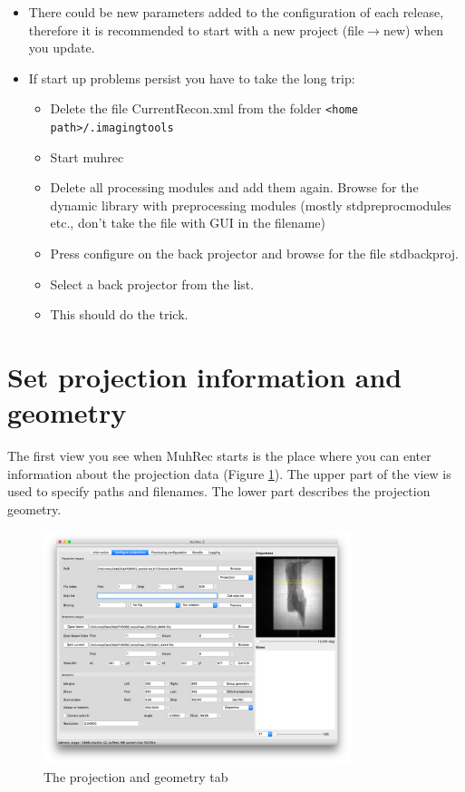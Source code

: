 \documentclass[a4paper]{scrreprt}
\begin{document}
\begin{itemize}
\item There could be new parameters added to the configuration of each release, therefore it is recommended to start with a new project (file$\rightarrow$new) when you update.
\item If start up problems persist you have to take the long trip:
\begin{itemize}
\item Delete the file CurrentRecon.xml from the folder \verb+<home path>/.imagingtools+
\item Start muhrec
\item Delete all processing modules and add them again. Browse for the dynamic library with preprocessing modules (mostly stdpreprocmodules etc., don't take the file with GUI in the filename)
\item Press configure on the back projector and browse for the file stdbackproj.
\item Select a back projector from the list.
\item This should do the trick.
\end{itemize}
\end{itemize}

\section{Set projection information and geometry}
The first view you see when MuhRec starts is the place where you can enter information about the projection data (Figure \ref{fig_ProjectionGeometry}). The upper part of the view is used to specify paths and filenames. The lower part describes the projection geometry.  
\begin{figure}[ht!]
\centering
 \includegraphics[width=0.8\textwidth]{figures3/Main_DataAndGeometry.png}
\caption{The projection and geometry tab}\label{fig_ProjectionGeometry}
\end{figure}
\end{document}
